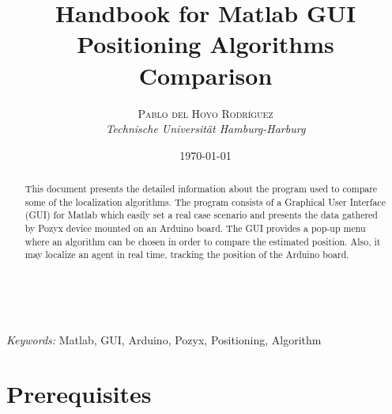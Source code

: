 \documentclass[a4paper, 21pt]{article} %
\title{\textbf{Handbook for Matlab GUI}\\ %
Positioning Algorithms Comparison} %
\author{\textsc{Pablo del Hoyo Rodríguez} %
\\{\textit{Technische Universität Hamburg-Harburg}}} %
\date{\today} %
\makeatletter
\renewcommand{\maketitle}{ %
\begin{flushright} %
{\LARGE\@title} %

\vspace{50pt} %

{\large\@author} %
\\\@date %

\vspace{40pt} %
\end{flushright}
}
\makeatother
\begin{document}
\maketitle %



\begin{abstract}
This document presents the detailed information about the program used to compare some of the localization algorithms. The program consists of a Graphical User Interface (GUI) for Matlab which easily set a real case scenario and presents the data gathered by Pozyx device mounted on an Arduino board. The GUI provides a pop-up menu where an algorithm can be chosen in order to compare the estimated position. Also, it may localize an agent in real time, tracking the position of the Arduino board.  
\end{abstract}

\hspace*{3,6mm}\textit{Keywords:} Matlab, GUI, Arduino, Pozyx, Positioning, Algorithm %

\vspace{30pt} %

\tableofcontents
\newpage

\section{Prerequisites}
\end{document}

